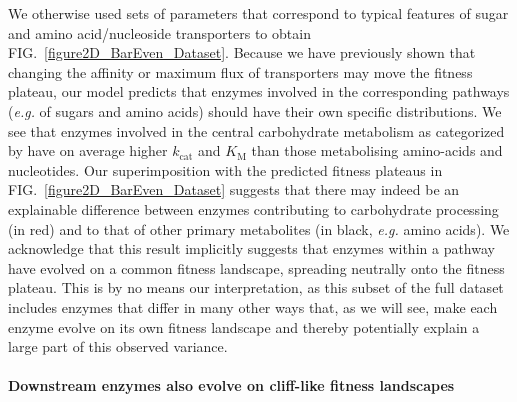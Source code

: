 We otherwise used sets of parameters that correspond to typical features of sugar and amino acid/nucleoside transporters to obtain FIG.~\ref{figure2D_BarEven_Dataset}. Because we have previously shown that changing the affinity or maximum flux of transporters may move the fitness plateau, our model predicts that enzymes involved in the corresponding pathways (\textit{e.g.} of sugars and amino acids) should have their own specific distributions. We see that enzymes involved in the central carbohydrate metabolism as categorized by \citet{Bar-Even11} have on average higher $k_\text{cat}$ and $K_\text{M}$ than those metabolising amino-acids and nucleotides. Our superimposition with the predicted fitness plateaus in FIG.~\ref{figure2D_BarEven_Dataset} suggests that there may indeed be an explainable difference between enzymes contributing to carbohydrate processing (in red) and to that of other primary metabolites (in black, \textit{e.g.} amino acids).
We acknowledge that this result implicitly suggests that enzymes within a pathway have evolved on a common fitness landscape, spreading neutrally onto the fitness plateau. This is by no means our interpretation, as this subset of the full dataset includes enzymes that differ in many other ways that, as we will see, make each enzyme evolve on its own fitness landscape and thereby potentially explain a large part of this observed variance. 

\noindent \paragraph{Downstream enzymes also evolve on cliff-like fitness landscapes}

